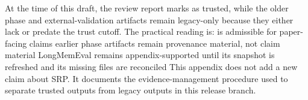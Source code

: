 \markdownRendererUlItem {}\markdownRendererUlItemEnd 
\markdownRendererUlItem {}\markdownRendererUlItemEnd 
\markdownRendererUlItem {}\markdownRendererUlItemEnd 
\markdownRendererUlItem {}\markdownRendererUlItemEnd 
\markdownRendererUlItem {}\markdownRendererUlItemEnd 
\markdownRendererUlEndTight \markdownRendererInterblockSeparator
{}
\markdownRendererSectionEnd \markdownRendererSectionBegin
{}\markdownRendererInterblockSeparator
{}At the time of this draft, the review report marks  as trusted, while the older phase and external-validation artifacts remain legacy-only because they either lack  or predate the trust cutoff.\markdownRendererParagraphSeparator
{}The practical reading is:\markdownRendererInterblockSeparator
{}\markdownRendererUlBeginTight
\markdownRendererUlItem {} is admissible for paper-facing claims\markdownRendererUlItemEnd 
\markdownRendererUlItem earlier phase artifacts remain provenance material, not claim material\markdownRendererUlItemEnd 
\markdownRendererUlItem LongMemEval remains appendix-supported until its snapshot is refreshed and its missing files are reconciled\markdownRendererUlItemEnd 
\markdownRendererUlEndTight \markdownRendererInterblockSeparator
{}This appendix does not add a new claim about SRP.\markdownRendererSoftLineBreak
{}It documents the evidence-management procedure used to separate trusted outputs from legacy outputs in this release branch.\markdownRendererInterblockSeparator
{}
\markdownRendererSectionEnd \markdownRendererSectionBegin
{}\markdownRendererInterblockSeparator
